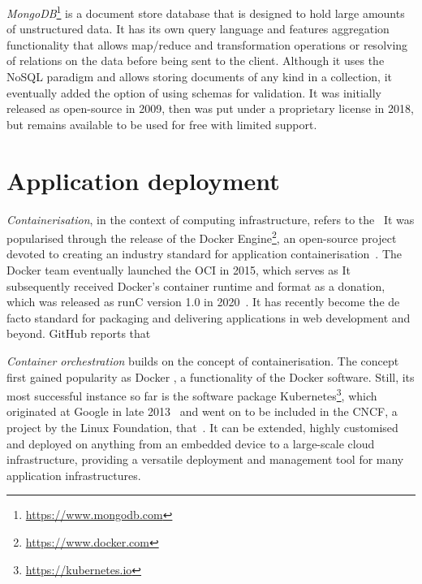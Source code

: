 \emph{MongoDB}\footnote{\url{https://www.mongodb.com}} is a document store database that is designed to hold large amounts of unstructured data.
It has its own query language and features aggregation functionality that allows map/reduce and transformation operations or resolving of relations on the data before being sent to the client.
Although it uses the \ac{NoSQL} paradigm and allows storing documents of any kind in a collection, it eventually added the option of using schemas for validation.
It was initially released as open-source in 2009, then was put under a proprietary license in 2018, but remains available to be used for free with limited support.

\section{Application deployment}
\label{sec:application-deployment}

\emph{Containerisation}, in the context of computing infrastructure, refers to the~ It was popularised through the release of the Docker Engine\footnote{\url{https://www.docker.com}}, an open-source project devoted to creating an industry standard for application containerisation~\parencite{dockerRelease}.
The Docker team eventually launched the \ac{OCI} in 2015, which serves as  It subsequently received Docker's container runtime and format as a donation, which was released as runC version 1.0 in 2020~\parencite{openContainerInitiative}.
It has recently become the de facto standard for packaging and delivering applications in web development and beyond.
GitHub reports that~

\emph{Container orchestration} builds on the concept of containerisation.  The concept first gained popularity as Docker , a functionality of the Docker software.
Still, its most successful instance so far is the software package Kubernetes\footnote{\url{https://kubernetes.io}}, which originated at Google in late 2013~\parencite{kubernetesHistory} and went on to be included in the \ac{CNCF}, a project by the Linux Foundation, that~.
It can be extended, highly customised and deployed on anything from an embedded device to a large-scale cloud infrastructure, providing a versatile deployment and management tool for many application infrastructures.
